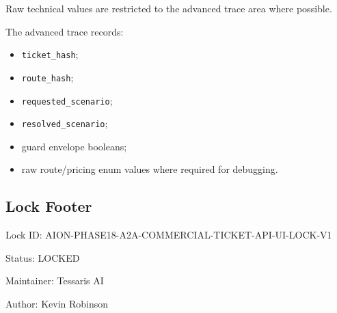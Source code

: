 Raw technical values are restricted to the advanced trace area where possible.

The advanced trace records:

\begin{itemize}
  \item \texttt{ticket\_hash};
  \item \texttt{route\_hash};
  \item \texttt{requested\_scenario};
  \item \texttt{resolved\_scenario};
  \item guard envelope booleans;
  \item raw route/pricing enum values where required for debugging.
\end{itemize}

\subsection{Lock Footer}

Lock ID: AION-PHASE18-A2A-COMMERCIAL-TICKET-API-UI-LOCK-V1

Status: LOCKED

Maintainer: Tessaris AI

Author: Kevin Robinson

